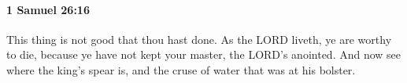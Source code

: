 
		\paragraph{1 Samuel 26:16} %
			\label{1SAMUEL-26-16}

			This thing is not good that thou hast done. As the LORD liveth, ye are worthy to die, because ye have not kept your master, the LORD’s anointed. And now see where the king’s spear is, and the cruse of water that was at his bolster.


